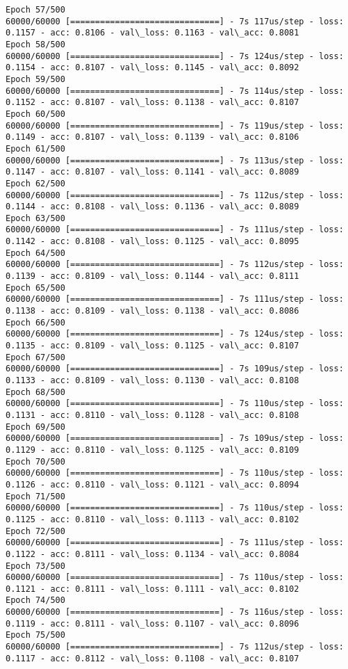 \documentclass[11pt]{article}
\begin{document}
\begin{Verbatim}[commandchars=\\\{\}]
Epoch 57/500
60000/60000 [==============================] - 7s 117us/step - loss: 0.1157 - acc: 0.8106 - val\_loss: 0.1163 - val\_acc: 0.8081
Epoch 58/500
60000/60000 [==============================] - 7s 124us/step - loss: 0.1154 - acc: 0.8107 - val\_loss: 0.1145 - val\_acc: 0.8092
Epoch 59/500
60000/60000 [==============================] - 7s 114us/step - loss: 0.1152 - acc: 0.8107 - val\_loss: 0.1138 - val\_acc: 0.8107
Epoch 60/500
60000/60000 [==============================] - 7s 119us/step - loss: 0.1149 - acc: 0.8107 - val\_loss: 0.1139 - val\_acc: 0.8106
Epoch 61/500
60000/60000 [==============================] - 7s 113us/step - loss: 0.1147 - acc: 0.8107 - val\_loss: 0.1141 - val\_acc: 0.8089
Epoch 62/500
60000/60000 [==============================] - 7s 112us/step - loss: 0.1144 - acc: 0.8108 - val\_loss: 0.1136 - val\_acc: 0.8089
Epoch 63/500
60000/60000 [==============================] - 7s 111us/step - loss: 0.1142 - acc: 0.8108 - val\_loss: 0.1125 - val\_acc: 0.8095
Epoch 64/500
60000/60000 [==============================] - 7s 112us/step - loss: 0.1139 - acc: 0.8109 - val\_loss: 0.1144 - val\_acc: 0.8111
Epoch 65/500
60000/60000 [==============================] - 7s 111us/step - loss: 0.1138 - acc: 0.8109 - val\_loss: 0.1138 - val\_acc: 0.8086
Epoch 66/500
60000/60000 [==============================] - 7s 124us/step - loss: 0.1135 - acc: 0.8109 - val\_loss: 0.1125 - val\_acc: 0.8107
Epoch 67/500
60000/60000 [==============================] - 7s 109us/step - loss: 0.1133 - acc: 0.8109 - val\_loss: 0.1130 - val\_acc: 0.8108
Epoch 68/500
60000/60000 [==============================] - 7s 110us/step - loss: 0.1131 - acc: 0.8110 - val\_loss: 0.1128 - val\_acc: 0.8108
Epoch 69/500
60000/60000 [==============================] - 7s 109us/step - loss: 0.1129 - acc: 0.8110 - val\_loss: 0.1125 - val\_acc: 0.8109
Epoch 70/500
60000/60000 [==============================] - 7s 110us/step - loss: 0.1126 - acc: 0.8110 - val\_loss: 0.1121 - val\_acc: 0.8094
Epoch 71/500
60000/60000 [==============================] - 7s 110us/step - loss: 0.1125 - acc: 0.8110 - val\_loss: 0.1113 - val\_acc: 0.8102
Epoch 72/500
60000/60000 [==============================] - 7s 111us/step - loss: 0.1122 - acc: 0.8111 - val\_loss: 0.1134 - val\_acc: 0.8084
Epoch 73/500
60000/60000 [==============================] - 7s 110us/step - loss: 0.1121 - acc: 0.8111 - val\_loss: 0.1111 - val\_acc: 0.8102
Epoch 74/500
60000/60000 [==============================] - 7s 116us/step - loss: 0.1119 - acc: 0.8111 - val\_loss: 0.1107 - val\_acc: 0.8096
Epoch 75/500
60000/60000 [==============================] - 7s 112us/step - loss: 0.1117 - acc: 0.8112 - val\_loss: 0.1108 - val\_acc: 0.8107

\end{Verbatim}
\end{document}
